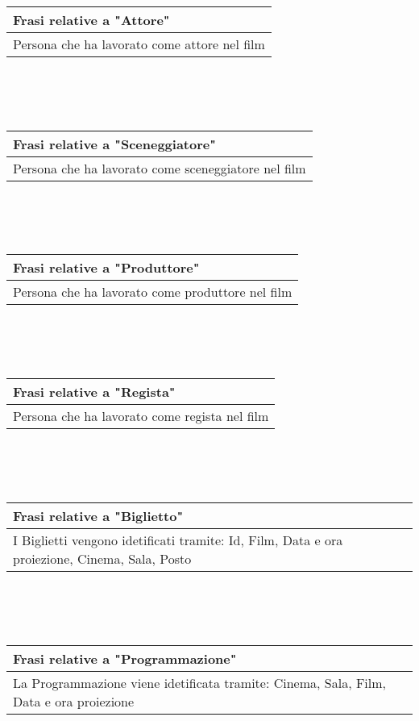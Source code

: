\documentclass[10pt]{article}
\begin{document}
 	\\\\\\
 	\begin{tabular} { |p{16.8cm}| }
 		\hline
 		\rowcolor{lightgray}
 		\textbf{Frasi relative a "Attore"} \\
 		\hline
 		Persona che ha lavorato come attore nel film \\
 		\hline 		
 	\end{tabular} 
	\\\\\\
	\begin{tabular} { |p{16.8cm}| }
		\hline
		\rowcolor{lightgray}
		\textbf{Frasi relative a "Sceneggiatore"} \\
		\hline
		Persona che ha lavorato come sceneggiatore nel film \\
		\hline 		
	\end{tabular} 
	\\\\\\
	\begin{tabular} { |p{16.8cm}| }
		\hline
		\rowcolor{lightgray}
		\textbf{Frasi relative a "Produttore"} \\
		\hline
		Persona che ha lavorato come produttore nel film \\
		\hline 		
	\end{tabular} 
	\\\\\\
	\begin{tabular} { |p{16.8cm}| }
		\hline
		\rowcolor{lightgray}
		\textbf{Frasi relative a "Regista"} \\
		\hline
		Persona che ha lavorato come regista nel film \\
		\hline 		
	\end{tabular} 
	\\\\\\
	\begin{tabular} { |p{16.8cm}| }
		\hline
		\rowcolor{lightgray}
		\textbf{Frasi relative a "Biglietto"} \\
		\hline
		I Biglietti vengono idetificati tramite: Id, Film, Data e ora proiezione, Cinema, Sala, Posto \\
		\hline 		
	\end{tabular} 
	\\\\\\
	\begin{tabular} { |p{16.8cm}| }
		\hline
		\rowcolor{lightgray}
		\textbf{Frasi relative a "Programmazione"} \\
		\hline
		La Programmazione viene idetificata tramite: Cinema, Sala, Film, Data e ora proiezione \\
		\hline 		
	\end{tabular} 
	
\end{document}
